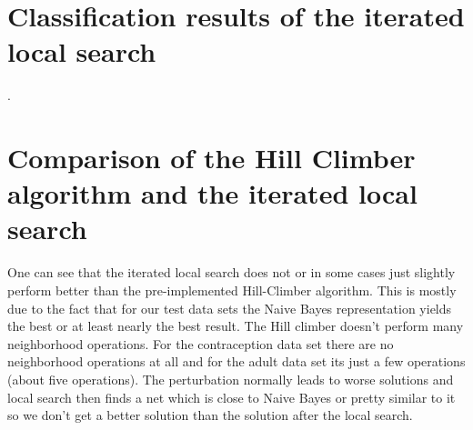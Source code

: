 \documentclass[paper=a4, fontsize=11pt]{scrartcl} %
\numberwithin{equation}{section} %
\numberwithin{figure}{section} %
\numberwithin{table}{section} %
\begin{document}
\section{Classification results of the iterated local search}

.

\section{Comparison of the Hill Climber algorithm and the iterated local search}

One can see that the iterated local search does not or in some cases just slightly perform better than the pre-implemented Hill-Climber algorithm. This is mostly due to the fact that for our test data sets the Naive Bayes representation yields the best or at least nearly the best result. The Hill climber doesn't perform many neighborhood operations. For the contraception data set there are no neighborhood operations at all and for the adult data set its just a few operations (about five operations). The perturbation normally leads to worse solutions and local search then finds a net which is close to Naive Bayes or pretty similar to it so we don't get a better solution than the solution after the local search.

%
%
%
%


%
%
%
%
%
\end{document}
